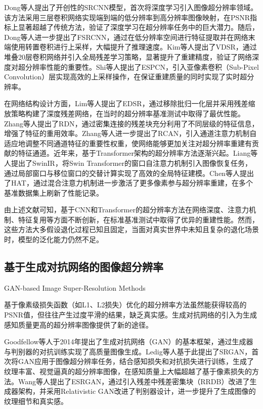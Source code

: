 Dong等人提出了开创性的SRCNN模型\cite{dong2014learning}，首次将深度学习引入图像超分辨率领域。该方法采用三层卷积网络实现端到端的低分辨率到高分辨率图像映射，在PSNR指标上显著超越了传统方法，验证了深度学习在超分辨率任务中的巨大潜力。随后，Dong等人进一步提出了FSRCNN\cite{dong2016accelerating}，通过在低分辨率空间进行特征提取并在网络末端使用转置卷积进行上采样，大幅提升了推理速度。Kim等人提出了VDSR\cite{kim2016accurate}，通过堆叠20层卷积网络并引入全局残差学习策略，显著提升了重建精度，验证了网络深度对超分辨率性能的重要性。Shi等人提出了ESPCN\cite{shi2016real}，引入亚像素卷积（Sub-Pixel Convolution）层实现高效的上采样操作，在保证重建质量的同时实现了实时超分辨率。

在网络结构设计方面，Lim等人提出了EDSR\cite{lim2017enhanced}，通过移除批归一化层并采用残差缩放策略构建了深度残差网络，在当时的超分辨率基准测试中取得了最优性能。Zhang等人提出了RDN\cite{zhang2018residual}，通过密集连接的残差块充分利用了不同层级的特征信息，增强了特征的重用效率。Zhang等人进一步提出了RCAN\cite{zhang2018image}，引入通道注意力机制自适应地调整不同通道特征的重要性权重，使网络能够更加关注对超分辨率重建有贡献的特征通道。近年来，基于Transformer架构的超分辨率方法逐渐兴起。Liang等人提出了SwinIR\cite{liang2021swinir}，将Swin Transformer\cite{liu2021swin}的窗口自注意力机制引入图像恢复任务，通过局部窗口与移位窗口的交替计算实现了高效的全局特征建模。Chen等人提出了HAT\cite{chen2023activating}，通过混合注意力机制进一步激活了更多像素参与超分辨率重建，在多个基准数据集上刷新了性能记录。

由上述文献可知，基于CNN和Transformer的超分辨率方法在网络深度、注意力机制、特征复用等方面不断创新，在标准基准测试中取得了优异的重建性能。然而，这些方法大多假设退化过程已知且固定，当面对真实世界中未知且复杂的退化场景时，模型的泛化能力仍然不足。

\subsection{基于生成对抗网络的图像超分辨率}{GAN-based Image Super-Resolution Methods}

基于像素级损失函数（如L1、L2损失）优化的超分辨率方法虽然能获得较高的PSNR值，但往往产生过度平滑的结果，缺乏真实感。生成对抗网络的引入为生成感知质量更高的超分辨率图像提供了新的途径。

Goodfellow等人于2014年提出了生成对抗网络（GAN）\cite{goodfellow2014generative}的基本框架，通过生成器与判别器的对抗训练实现了高质量图像生成。Ledig等人基于此提出了SRGAN\cite{ledig2017photo}，首次将GAN应用于图像超分辨率任务，结合感知损失\cite{johnson2016perceptual}和对抗损失进行训练，生成了纹理丰富、视觉逼真的超分辨率图像，在感知质量上大幅超越了基于像素损失的方法。Wang等人提出了ESRGAN\cite{wang2018esrgan}，通过引入残差中残差密集块（RRDB）改进了生成器架构，并采用Relativistic GAN改进了判别器设计，进一步提升了生成图像的纹理细节和真实感。


